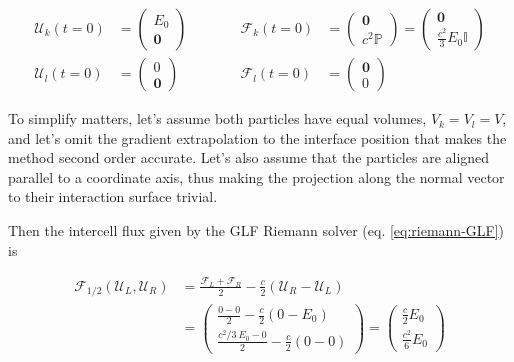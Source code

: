 \begin{align}
    \mathcal{U}_k(t = 0) &= \left( \begin{matrix}
                    E_0 \\
                    \mathbf{0}
                  \end{matrix} \right)
    \quad & \quad \quad
    \mathcal{F}_k(t = 0)  &= \left( \begin{matrix}
                   \mathbf{0} \\
                   c^2 \mathds{P}
                  \end{matrix} \right)
                = \left( \begin{matrix}
                   \mathbf{0} \\
                   \frac{c^2}{3} E_0 \mathds{I}
                  \end{matrix} \right)\\
%
    \mathcal{U}_l(t = 0) &= \left( \begin{matrix}
                    0 \\
                    \mathbf{0}
                  \end{matrix} \right)
    \quad & \quad \quad
    \mathcal{F}_l(t = 0)  &= \left( \begin{matrix}
                   \mathbf{0} \\
                   0
                  \end{matrix} \right)
\end{align}

To simplify matters, let's assume both particles have equal volumes, $V_k = V_l = V$, and let's 
omit the gradient extrapolation to the interface position that makes the method second order 
accurate. Let's also assume that the particles are aligned parallel to a coordinate axis,  thus 
making the projection along the normal vector to their interaction surface trivial.

Then the intercell flux given by the GLF Riemann solver (eq. \ref{eq:riemann-GLF}) is

\begin{align}
	\mathcal{F}_{1/2}(\mathcal{U}_L, \mathcal{U}_R) &=
		\frac{\mathcal{F}_{L} + \mathcal{F}_{R}}{2} -
		\frac{c}{2} \left(\mathcal{U}_R - \mathcal{U}_L \right) \\
	&=	\left(\begin{matrix}
        \frac{0 - 0}{2} - \frac{c}{2} (0 - E_0)\\
        \frac{c^2 / 3 \ E_0 - 0}{2} - \frac{c}{2} (0 -0)
	  	\end{matrix} \right)
	=	\left(\begin{matrix}
        \frac{c}{2} E_0 \\
        \frac{c^2}{6} E_0
	  	\end{matrix} \right)
\end{align}


